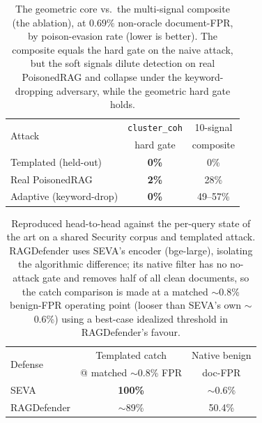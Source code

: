 \documentclass[10pt,journal,compsoc]{IEEEtran}
\begin{document}
\begin{table}[H]
\centering
\caption{The geometric core vs.\ the multi-signal composite (the ablation), at
$0.69\%$ non-oracle document-FPR, by poison-evasion rate (lower is better). The
composite equals the hard gate on the naive attack, but the soft signals dilute
detection on real PoisonedRAG and collapse under the keyword-dropping adversary,
while the geometric hard gate holds.}
\label{tab:core}
\begin{tabular}{lcc}
\toprule
\multirow{2}{*}{Attack} & \texttt{cluster\_coh} & 10-signal \\
       & hard gate & composite \\
\midrule
Templated (held-out)    & \textbf{0\%} & 0\% \\
Real PoisonedRAG        & \textbf{2\%} & 28\% \\
Adaptive (keyword-drop) & \textbf{0\%} & 49--57\% \\
\bottomrule
\end{tabular}
\end{table}
\begin{table}[H]
\centering
\caption{Reproduced head-to-head against the per-query state of the art on a
shared Security corpus and templated attack. RAGDefender uses SEVA's encoder
(bge-large), isolating the algorithmic difference; its native filter has no
no-attack gate and removes half of all clean documents, so the catch comparison
is made at a matched $\sim$0.8\% benign-FPR operating point (looser than SEVA's own
$\sim$0.6\%) using a best-case idealized threshold in RAGDefender's favour.}
\label{tab:h2h}
\begin{tabular}{lcc}
\toprule
\multirow{2}{*}{Defense} & Templated catch & Native benign \\
        & @ matched $\sim$0.8\% FPR & doc-FPR \\
\midrule
SEVA & \textbf{100\%} & $\sim$0.6\% \\
RAGDefender & $\sim$89\% & 50.4\% \\
\bottomrule
\end{tabular}
\end{table}
\end{document}
